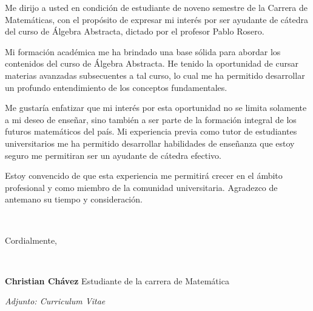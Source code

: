 \documentclass[11pt,a4paper,sans]{moderncv}        %
\begin{document}
Me dirijo a usted en condición de estudiante de noveno semestre de la Carrera de Matemáticas, con el propósito de expresar mi interés por ser ayudante de cátedra del curso de Álgebra Abstracta, dictado por el profesor Pablo Rosero.


Mi formación académica  me ha brindado una base sólida para abordar los contenidos del curso de Álgebra Abstracta. He tenido la oportunidad de cursar materias avanzadas subsecuentes a tal curso, lo cual me ha permitido desarrollar un profundo entendimiento de los conceptos fundamentales.


Me gustaría enfatizar que mi interés por esta oportunidad no se limita solamente a mi deseo de enseñar, sino también a ser parte de la formación integral de los futuros matemáticos del país. Mi experiencia previa como tutor de estudiantes universitarios me ha permitido desarrollar habilidades de  enseñanza que estoy seguro me permitiran ser un ayudante de cátedra efectivo.


Estoy convencido de que esta experiencia me permitirá crecer en el ámbito profesional y como  miembro de la comunidad universitaria.
Agradezco de antemano su tiempo y consideración.

~

Cordialmente,

~

\textbf{Christian Chávez}\hfill
Estudiante de la carrera de Matemática

\vspace{10\baselineskip}


\textit{Adjunto: Curriculum Vitae}



 
\end{document}
